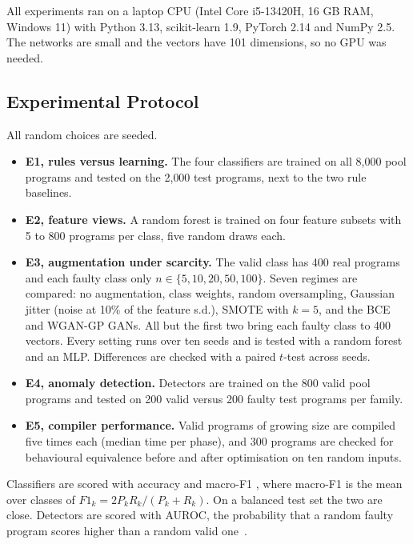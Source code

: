 All experiments ran on a laptop CPU (Intel Core i5-13420H, 16 GB RAM, Windows 11) with Python 3.13, scikit-learn 1.9,
PyTorch 2.14 and NumPy 2.5. The networks are small and the vectors have 101 dimensions, so no GPU was needed.

\subsection{Experimental Protocol}

All random choices are seeded.

\begin{itemize}
    \item \textbf{E1, rules versus learning.} The four classifiers are trained on all 8{,}000 pool programs and tested on
    the 2{,}000 test programs, next to the two rule baselines.
    \item \textbf{E2, feature views.} A random forest is trained on four feature subsets with 5 to 800 programs per class,
    five random draws each.
    \item \textbf{E3, augmentation under scarcity.} The valid class has 400 real programs and each faulty class only
    $n\in\{5,10,20,50,100\}$. Seven regimes are compared: no augmentation, class weights, random oversampling, Gaussian
    jitter (noise at 10\% of the feature s.d.), SMOTE with $k=5$, and the BCE and WGAN-GP GANs. All but the first two bring
    each faulty class to 400 vectors. Every setting runs over ten seeds and is tested with a random forest and an MLP.
    Differences are checked with a paired $t$-test across seeds.
    \item \textbf{E4, anomaly detection.} Detectors are trained on the 800 valid pool programs and tested on 200 valid
    versus 200 faulty test programs per family.
    \item \textbf{E5, compiler performance.} Valid programs of growing size are compiled five times each (median time per
    phase), and 300 programs are checked for behavioural equivalence before and after optimisation on ten random inputs.
\end{itemize}

Classifiers are scored with accuracy and macro-F1 \cite{sokolova2009}, where macro-F1 is the mean over classes of
$F1_k=2P_kR_k/(P_k+R_k)$. On a balanced test set the two are close. Detectors are scored with AUROC, the probability that a
random faulty program scores higher than a random valid one~\cite{fawcett2006}.
